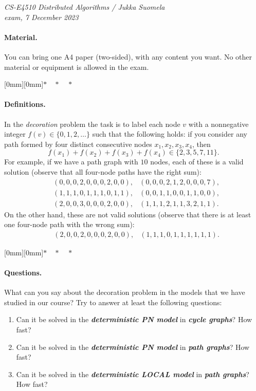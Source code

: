 \documentclass[12pt,a4paper]{article}
\newcommand{\sep}{{\centering \raisebox{-3mm}[0mm][0mm]{$*\quad*\quad*$}\par}}
\newcommand{\cemph}[1]{\textbf{\emph{\boldmath #1}}}
\begin{document}
\noindent
\emph{CS-E4510 Distributed Algorithms / Jukka Suomela\\
exam, 7 December 2023}

\paragraph{Material.}

You can bring one A4 paper (two-sided), with any content you want. No other material or equipment is allowed in the exam.

\sep

\paragraph{Definitions.}

In the \emph{decoration} problem the task is to label each node $v$ with a nonnegative integer $f(v) \in \{0,1,2,\dotsc\}$ such that the following holds: if you consider any path formed by four distinct consecutive nodes $x_1, x_2, x_3, x_4$, then
\[
    f(x_1) + f(x_2) + f(x_3) + f(x_4) \in \{ 2, 3, 5, 7, 11 \}.
\]
For example, if we have a path graph with $10$ nodes, each of these is a valid solution (observe that all four-node paths have the right sum):
\begin{align*}
    &(0,0,0,2,0,0,0,2,0,0),
    &(0,0,0,2,1,2,0,0,0,7), \\
    &(1,1,1,0,1,1,1,0,1,1),
    &(0,0,1,1,0,0,1,1,0,0), \\
    &(2,0,0,3,0,0,0,2,0,0),
    &(1,1,1,2,1,1,3,2,1,1).
\end{align*}
On the other hand, these are not valid solutions (observe that there is at least one four-node path with the wrong sum):
\begin{align*}
    &(2,0,0,2,0,0,0,2,0,0),
    &(1,1,1,0,1,1,1,1,1,1).
\end{align*}

\sep

\paragraph{Questions.}

What can you say about the decoration problem in the models that we have studied in our course? Try to answer at least the following questions:
\begin{enumerate}
    \item Can it be solved in the \cemph{deterministic PN model} in \cemph{cycle graphs}? How fast?
    \item Can it be solved in the \cemph{deterministic PN model} in \cemph{path graphs}? How fast?
    \item Can it be solved in the \cemph{deterministic LOCAL model} in \cemph{path graphs}? How fast?
\end{enumerate}
\end{document}
